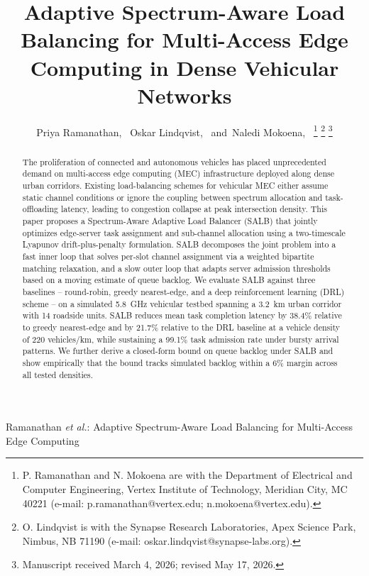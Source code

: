 \documentclass[journal,10pt]{IEEEtran}
\begin{document}
\title{Adaptive Spectrum-Aware Load Balancing for Multi-Access Edge Computing in Dense Vehicular Networks}

\author{Priya Ramanathan,~
        Oskar Lindqvist,~
        and~Naledi Mokoena,~
\thanks{P. Ramanathan and N. Mokoena are with the Department of Electrical and Computer Engineering, Vertex Institute of Technology, Meridian City, MC 40221 (e-mail: p.ramanathan@vertex.edu; n.mokoena@vertex.edu).}
\thanks{O. Lindqvist is with the Synapse Research Laboratories, Apex Science Park, Nimbus, NB 71190 (e-mail: oskar.lindqvist@synapse-labs.org).}
\thanks{Manuscript received March 4, 2026; revised May 17, 2026.}}

%
{Ramanathan \MakeLowercase{\textit{et al.}}: Adaptive Spectrum-Aware Load Balancing for Multi-Access Edge Computing}

\maketitle

\begin{abstract}
The proliferation of connected and autonomous vehicles has placed unprecedented demand on multi-access edge computing (MEC) infrastructure deployed along dense urban corridors. Existing load-balancing schemes for vehicular MEC either assume static channel conditions or ignore the coupling between spectrum allocation and task-offloading latency, leading to congestion collapse at peak intersection density. This paper proposes a Spectrum-Aware Adaptive Load Balancer (SALB) that jointly optimizes edge-server task assignment and sub-channel allocation using a two-timescale Lyapunov drift-plus-penalty formulation. SALB decomposes the joint problem into a fast inner loop that solves per-slot channel assignment via a weighted bipartite matching relaxation, and a slow outer loop that adapts server admission thresholds based on a moving estimate of queue backlog. We evaluate SALB against three baselines -- round-robin, greedy nearest-edge, and a deep reinforcement learning (DRL) scheme -- on a simulated 5.8~GHz vehicular testbed spanning a 3.2~km urban corridor with 14 roadside units. SALB reduces mean task completion latency by 38.4\% relative to greedy nearest-edge and by 21.7\% relative to the DRL baseline at a vehicle density of 220 vehicles/km, while sustaining a 99.1\% task admission rate under bursty arrival patterns. We further derive a closed-form bound on queue backlog under SALB and show empirically that the bound tracks simulated backlog within a 6\% margin across all tested densities.
\end{abstract}
\end{document}
